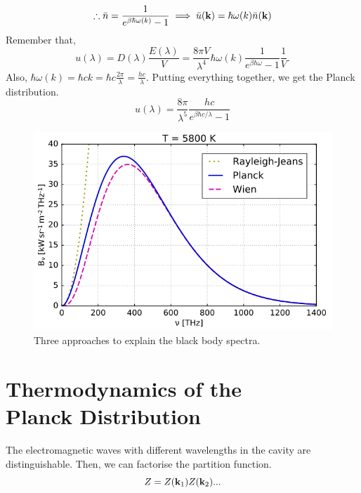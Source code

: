 \begin{equation}
    \therefore \bar{n}=\frac{1}{e^{\beta\hbar\omega(k)}-1}\implies \bar{u}(\mathbf{k}) = \hbar\omega(k)\bar{n}(\mathbf{k})
\end{equation}
Remember that, 
\begin{equation}
    u(\lambda) = D(\lambda)\frac{E(\lambda)}{V} = \frac{8\pi V}{\lambda^4}\hbar\omega(k)\frac{1}{e^{\beta\hbar\omega}-1}\frac{1}{V}.
\end{equation}
Also, $\hbar\omega(k) = \hbar ck = \hbar c\frac{2\pi}{\lambda}=\frac{hc}{\lambda}$. Putting everything together, we get the Planck distribution.
\begin{equation}
    u(\lambda) = \frac{8\pi}{\lambda^5}\frac{hc}{e^{\beta\hbar c/\lambda}-1}
\end{equation}
\begin{figure}[h!]
   \centering
   \includegraphics[width=0.5\linewidth]{blackbodydist.png}
   \caption{Three approaches to explain the black body spectra.}
   \label{fig:blackbodydist}
\end{figure}
\newpage

\section{Thermodynamics of the \\
Planck Distribution}
    The electromagnetic waves with different wavelengths in the cavity are distinguishable. Then, we can factorise the partition function. 
    \begin{equation}
        Z = Z(\mathbf{k}_1)Z(\mathbf{k}_2)...
    \end{equation}

